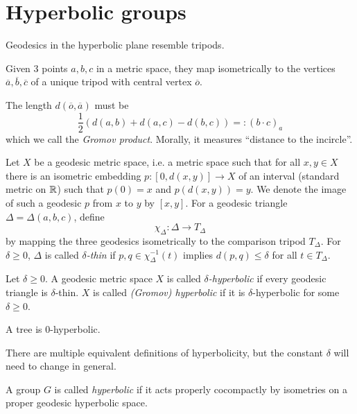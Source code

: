 \section{Hyperbolic groups}

Geodesics in the hyperbolic plane resemble tripods.


Given 3 points $a, b, c$ in a metric space, they map isometrically to the vertices $\overline{a}, \overline{b}, \overline{c}$ of a unique tripod with central vertex $\overline{o}$.

The length $d(\overline{o}, \overline{a})$ must be \[
    \frac{1}{2}(d(a, b) + d(a, c) - d(b, c)) =: (b \cdot c)_a
\] which we call the \emph{Gromov product}.
Morally, it measures ``distance to the incircle''.

Let $X$ be a geodesic metric space, i.e. a metric space such that for all $x, y \in X$ there is an isometric embedding $p \colon [0, d(x, y)] \to X$ of an interval (standard metric on $\mathbb{R}$) such that $p(0) = x$ and $p(d(x, y)) = y$.
We denote the image of such a geodesic $p$ from $x$ to $y$ by $[x, y]$.
For a geodesic triangle $\Delta = \Delta(a, b, c)$, define \[
    \chi_\Delta \colon \Delta \to T_\Delta
\] by mapping the three geodesics isometrically to the comparison tripod $T_\Delta$.
For $\delta \geq 0$, $\Delta$ is called \emph{$\delta$-thin} if $p, q \in \chi_\Delta^{-1}(t)$ implies $d(p, q) \leq \delta$ for all $t \in T_\Delta$.

\begin{definition}
    Let $\delta \geq 0$.
    A geodesic metric space $X$ is called \emph{$\delta$-hyperbolic} if every geodesic triangle is $\delta$-thin.
    $X$ is called \emph{(Gromov) hyperbolic} if it is $\delta$-hyperbolic for some $\delta \geq 0$.
\end{definition}

\begin{example}
    A tree is $0$-hyperbolic.
\end{example}

\begin{warning}
    There are multiple equivalent definitions of hyperbolicity, but the constant $\delta$ will need to change in general.
\end{warning}

\begin{definition}
    A group $G$ is called \emph{hyperbolic} if it acts properly cocompactly by isometries on a proper geodesic hyperbolic space.
\end{definition}

